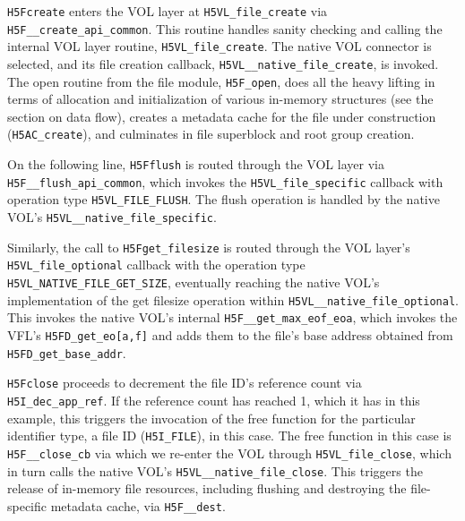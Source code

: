 \texttt{H5Fcreate} enters the VOL layer at \texttt{H5VL\_file\_create} via \texttt{H5F\_\_create\_api\_common}. This routine handles sanity checking and calling the internal VOL layer routine, \texttt{H5VL\_file\_create}. The native VOL connector is selected, and its file creation callback, \texttt{H5VL\_\_native\_file\_create}, is invoked. The open routine from the file module, \texttt{H5F\_open}, does all the heavy lifting in terms of allocation and initialization of various in-memory structures (see the section on data flow), creates a metadata cache for the file under construction (\texttt{H5AC\_create}), and culminates in file superblock and root group creation.

On the following line, \texttt{H5Fflush} is routed through the VOL layer via \texttt{H5F\_\_flush\_api\_common}, which invokes the \texttt{H5VL\_file\_specific} callback with operation type \texttt{H5VL\_FILE\_FLUSH}. The flush operation is handled by the native VOL's \texttt{H5VL\_\_native\_file\_specific}.

Similarly, the call to \texttt{H5Fget\_filesize} is routed through the VOL layer's \texttt{H5VL\_file\_optional} callback with the operation type \texttt{H5VL\_NATIVE\_FILE\_GET\_SIZE}, eventually reaching the native VOL's implementation of the get filesize operation within \texttt{H5VL\_\_native\_file\_optional}. This invokes the native VOL's internal \texttt{H5F\_\_get\_max\_eof\_eoa}, which invokes the VFL's \texttt{H5FD\_get\_eo[a,f]} and adds them to the file's base address obtained from \texttt{H5FD\_get\_base\_addr}.

\texttt{H5Fclose} proceeds to decrement the file ID's reference count via \texttt{H5I\_dec\_app\_ref}. If the reference count has reached 1, which it has in this example, this triggers the invocation of the free function for the particular identifier type, a file ID (\texttt{H5I\_FILE}), in this case. The free function in this case is \texttt{H5F\_\_close\_cb} via which we re-enter the VOL through \texttt{H5VL\_file\_close}, which in turn calls the native VOL's \texttt{H5VL\_\_native\_file\_close}. This triggers the release of in-memory file resources, including flushing and destroying the file-specific metadata cache, via \texttt{H5F\_\_dest}.

